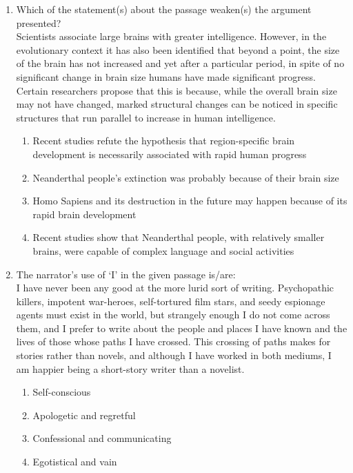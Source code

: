 \documentclass{article}
\begin{document}
\begin{enumerate}[leftmargin=*, start=18, label=Q.\arabic*.]
    \item Which of the statement(s) about the passage weaken(s) the argument presented? \\
    Scientists associate large brains with greater intelligence. However, in the evolutionary context it has also been identified that beyond a point, the size of the brain has not increased and yet after a particular period, in spite of no significant change in brain size humans have made significant progress. Certain researchers propose that this is because, while the overall brain size may not have changed, marked structural changes can be noticed in specific structures that run parallel to increase in human intelligence.
    
    \begin{enumerate}
        \item Recent studies refute the hypothesis that region-specific brain development is necessarily associated with rapid human progress
        \item Neanderthal people’s extinction was probably because of their brain size
        \item Homo Sapiens and its destruction in the future may happen because of its rapid brain development
        \item Recent studies show that Neanderthal people, with relatively smaller brains, were capable of complex language and social activities
    \end{enumerate}

    \item The narrator’s use of ‘I’ in the given passage is/are: \\
    I have never been any good at the more lurid sort of writing. Psychopathic killers, impotent war-heroes, self-tortured film stars, and seedy espionage agents must exist in the world, but strangely enough I do not come across them, and I prefer to write about the people and places I have known and the lives of those whose paths I have crossed. This crossing of paths makes for stories rather than novels, and although I have worked in both mediums, I am happier being a short-story writer than a novelist.

    \begin{multicols}{2}
        \begin{enumerate}
            \item Self-conscious
            \item Apologetic and regretful
            \item Confessional and communicating
            \item Egotistical and vain
        \end{enumerate}
    \end{multicols}
    

\end{enumerate}
\end{document}
